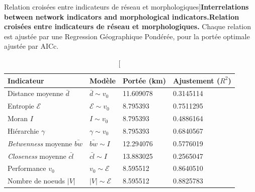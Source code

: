 \begin{table}
\caption[Interrelations between network indicators and morphological indicators][Relation croisées entre indicateurs de réseau et morphologiques]{\textbf{Interrelations between network indicators and morphological indicators.}\label{tab:staticcorrelations:gwr}}{\textbf{Relation croisées entre indicateurs de réseau et morphologiques.} Chaque relation est ajustée par une Regression Géographique Pondérée, pour la portée optimale ajustée par AICc.\label{tab:staticcorrelations:gwr}}
\begin{tabular}{|l|l|l|l|}
\hline
Indicateur & Modèle & Portée (km) & Ajustement ($R^2$) \\ \hline
Distance moyenne $\bar{d}$ & $\bar{d} \sim v_0$ & 11.609078 & 0.3145114 \\
Entropie $\mathcal{E}$  & $\mathcal{E} \sim v_0$ &  8.795393  &0.7511295 \\
Moran $I$ & $I \sim v_0$ &  8.795393 & 0.4886164 \\
Hiérarchie $\gamma$ & $\gamma \sim v_0$ & 8.795393  & 0.6840567 \\\hline
\emph{Betwenness} moyenne $\bar{bw}$ & $\bar{bw} \sim I$ & 12.294076 & 0.5776019 \\
\emph{Closeness} moyenne $\bar{cl}$ & $\bar{cl}\sim I$ & 13.883025 & 0.2565047 \\
Performance $v_0$ & $v_0 \sim \mathcal{E}$ & 8.595512  & 0.8640510 \\
Nombre de noeuds $\left|V\right|$ & $\left|V\right| \sim \mathcal{E}$ & 8.595512  & 0.8825783 \\\hline
\end{tabular}
\end{table}







